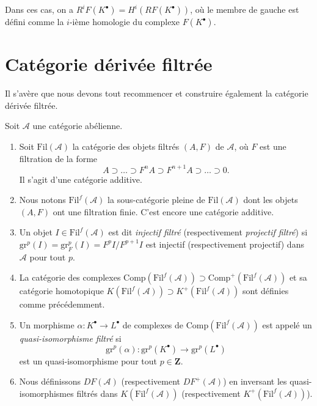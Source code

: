 \begin{remark}
\label{remark-cohomology-of-derived-functor}
Dans ces cas, on a $R^iF(K^\bullet) = H^i(RF(K^\bullet))$, où
le membre de gauche est défini comme la $i$-ième homologie du complexe
$F(K^\bullet)$.
\end{remark}




\section{Catégorie dérivée filtrée}
\label{section-filtered-derived-category}

\noindent
Il s'avère que nous devons tout recommencer et construire également la catégorie
dérivée filtrée.

\begin{definition}
\label{definition-filtered}
Soit $\mathcal{A}$ une catégorie abélienne.
\begin{enumerate}
\item Soit $\text{Fil}(\mathcal{A})$ la catégorie des objets filtrés
$(A, F)$ de $\mathcal{A}$, où $F$ est une filtration de la forme
$$
A \supset \ldots \supset F^n A \supset F^{n+1}A \supset \ldots
\supset 0.
$$
Il s'agit d'une catégorie additive.
\item Nous notons $\text{Fil}^f(\mathcal{A})$ la sous-catégorie pleine
de $\text{Fil}(\mathcal{A})$ dont les objets $(A, F)$ ont une filtration
finie. C'est encore une catégorie additive.
\item Un objet $I \in \text{Fil}^f(\mathcal{A})$ est dit
{\it injectif filtré} (respectivement {\it projectif filtré}) si
$\text{gr}^p(I) = \text{gr}_F^p(I) = F^pI/F^{p+1}I$ est injectif
(respectivement projectif) dans $\mathcal{A}$ pour tout $p$.
\item La catégorie des complexes
$\text{Comp}(\text{Fil}^f(\mathcal{A})) \supset
\text{Comp}^+(\text{Fil}^f(\mathcal{A}))$
et sa catégorie homotopique
$K(\text{Fil}^f(\mathcal{A})) \supset K^+(\text{Fil}^f(\mathcal A))$
sont définies comme précédemment.
\item Un morphisme $\alpha : K^\bullet \to L^\bullet$ de complexes de
$\text{Comp}(\text{Fil}^f(\mathcal{A}))$ est appelé un
{\it quasi-isomorphisme filtré} si
$$
\text{gr}^p(\alpha): \text{gr}^p(K^\bullet) \to \text{gr}^p(L^\bullet)
$$
est un quasi-isomorphisme pour tout $p \in \mathbf{Z}$.
\item Nous définissons $DF(\mathcal{A})$ (respectivement $DF^+(\mathcal{A})$)
en inversant les quasi-isomorphismes filtrés dans
$K(\text{Fil}^f(\mathcal{A}))$ (respectivement $K^+(\text{Fil}^f(\mathcal{A}))$).
\end{enumerate}
\end{definition}


